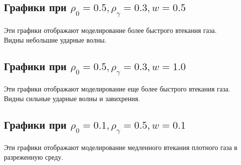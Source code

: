 \documentclass[12pt,a4paper]{article}
\begin{document}
\subsection{Графики при $\rho_{0} = 0.5, \rho_{\gamma} = 0.3, w = 0.5$}
Эти графики отображают моделирование более быстрого втекания газа. \\
Видны небольшие ударные волны.


\subsection{Графики при $\rho_{0} = 0.5, \rho_{\gamma} = 0.3, w = 1.0$}
Эти графики отображают моделирование еще более быстрого втекания газа. \\
Видны сильные ударные волны и завихрения.


\subsection{Графики при $\rho_{0} = 0.1, \rho_{\gamma} = 0.5, w = 0.1$}
Эти графики отображают моделирование медленного втекания плотного газа в разреженную среду.

\end{document}
